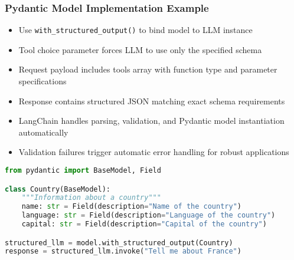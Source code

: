 \begin{frame}[fragile]\frametitle{Pydantic Model Implementation Example}
      \begin{itemize}
	\item Use \texttt{with\_structured\_output()} to bind model to LLM instance
	\item Tool choice parameter forces LLM to use only the specified schema
	\item Request payload includes tools array with function type and parameter specifications
	\item Response contains structured JSON matching exact schema requirements
	\item LangChain handles parsing, validation, and Pydantic model instantiation automatically
	\item Validation failures trigger automatic error handling for robust applications
	  \end{itemize}

\begin{lstlisting}[language=Python, basicstyle=\tiny]
from pydantic import BaseModel, Field

class Country(BaseModel):
    """Information about a country"""
    name: str = Field(description="Name of the country")
    language: str = Field(description="Language of the country")
    capital: str = Field(description="Capital of the country")

structured_llm = model.with_structured_output(Country)
response = structured_llm.invoke("Tell me about France")
\end{lstlisting}
\end{frame}

